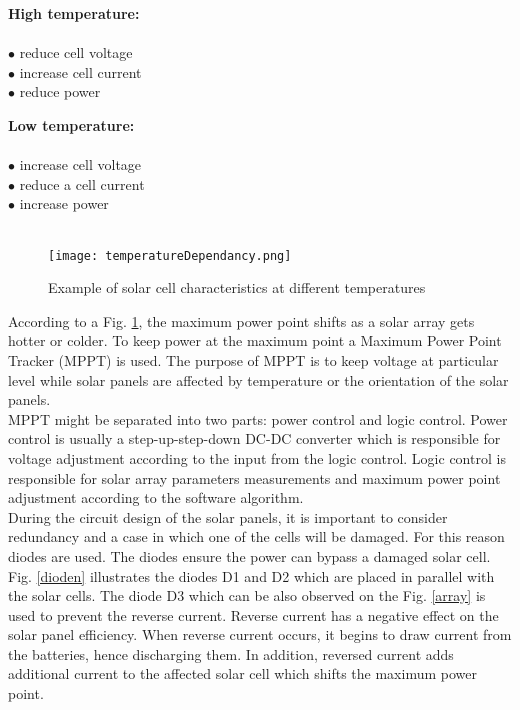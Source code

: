 \begin{multicols}{2}
	\textbf{High  temperature:} \\ \\
	$\bullet$ reduce cell voltage \\
	$\bullet$ increase cell current\\
	$\bullet$ reduce power\\
	

	\columnbreak
	
	\textbf{Low temperature:}\\ \\
	$\bullet$ increase cell voltage\\
	$\bullet$ reduce a cell current\\
	$\bullet$ increase power\\
	\\
\end{multicols}


	\begin{figure}[h]
		\centering
		\texttt{[image: temperatureDependancy.png]}
		\caption{ Example of solar cell characteristics at different temperatures\cite{6} }
		\label{fig: EPS11}
	\end{figure}
	
According to a Fig. \ref{fig: EPS11}, the maximum power point shifts as a solar array gets hotter or colder. To keep power at the maximum point a Maximum Power Point Tracker (MPPT) is used. The purpose of MPPT is to keep voltage at particular level while solar panels are affected by temperature or the orientation of the solar panels.\\
 MPPT might be separated into two parts: power control and logic control. Power control is usually a step-up-step-down DC-DC  converter which is responsible for voltage adjustment according to the input from the logic control. Logic control is responsible for solar array parameters measurements and maximum power point adjustment according to the software algorithm\cite{20}.\\  

During the circuit design of the solar panels, it is important to consider redundancy and a case in which one of the cells will be damaged. For this reason diodes are used. The diodes ensure the power can bypass a damaged solar cell. Fig. \ref{dioden} illustrates the diodes D1 and D2 which are placed in parallel with the solar cells. The diode D3 which can be also observed on the Fig. \ref{array} is used to prevent the reverse current. Reverse current has a negative effect on the solar panel efficiency. When reverse current occurs, it begins to draw current from the batteries, hence discharging them. In addition, reversed current adds additional current to the affected solar cell which shifts the maximum power point.\\


